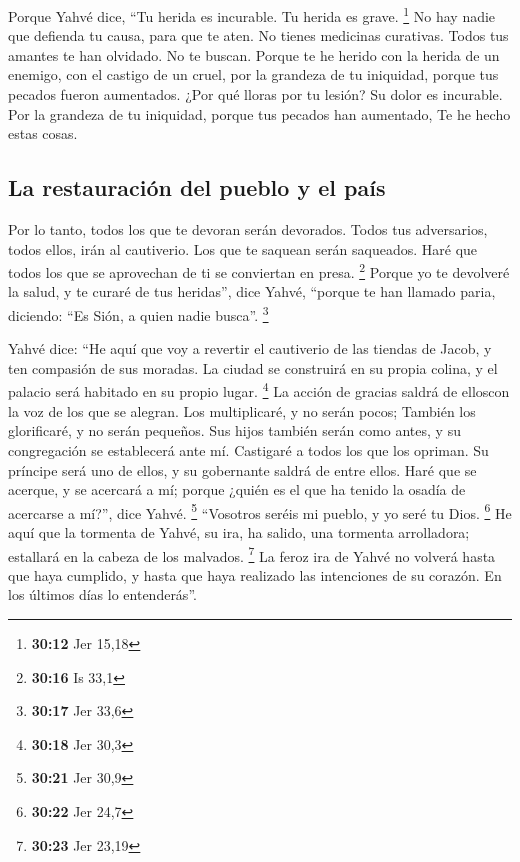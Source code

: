  Porque Yahvé dice, ``Tu herida es incurable. Tu herida
es grave. \footnote{\textbf{30:12} Jer 15,18}  No hay
nadie que defienda tu causa, para que te aten. No tienes medicinas
curativas.  Todos tus amantes te han olvidado. No te
buscan. Porque te he herido con la herida de un enemigo, con el castigo
de un cruel, por la grandeza de tu iniquidad, porque tus pecados fueron
aumentados.  ¿Por qué lloras por tu lesión? Su dolor es
incurable. Por la grandeza de tu iniquidad, porque tus pecados han
aumentado, Te he hecho estas cosas.

\hypertarget{la-restauraciuxf3n-del-pueblo-y-el-pauxeds}{%
\subsection{La restauración del pueblo y el
país}\label{la-restauraciuxf3n-del-pueblo-y-el-pauxeds}}

 Por lo tanto, todos los que te devoran serán devorados.
Todos tus adversarios, todos ellos, irán al cautiverio. Los que te
saquean serán saqueados. Haré que todos los que se aprovechan de ti se
conviertan en presa. \footnote{\textbf{30:16} Is 33,1} 
Porque yo te devolveré la salud, y te curaré de tus heridas'', dice
Yahvé, ``porque te han llamado paria, diciendo: ``Es Sión, a quien nadie
busca''. \footnote{\textbf{30:17} Jer 33,6}

 Yahvé dice: ``He aquí que voy a revertir el cautiverio
de las tiendas de Jacob, y ten compasión de sus moradas. La ciudad se
construirá en su propia colina, y el palacio será habitado en su propio
lugar. \footnote{\textbf{30:18} Jer 30,3}  La acción de
gracias saldrá de elloscon la voz de los que se alegran. Los
multiplicaré, y no serán pocos; También los glorificaré, y no serán
pequeños.  Sus hijos también serán como antes, y su
congregación se establecerá ante mí. Castigaré a todos los que los
opriman.  Su príncipe será uno de ellos, y su gobernante
saldrá de entre ellos. Haré que se acerque, y se acercará a mí; porque
¿quién es el que ha tenido la osadía de acercarse a mí?'', dice Yahvé.
\footnote{\textbf{30:21} Jer 30,9}  ``Vosotros seréis mi
pueblo, y yo seré tu Dios. \footnote{\textbf{30:22} Jer 24,7}
 He aquí que la tormenta de Yahvé, su ira, ha salido, una
tormenta arrolladora; estallará en la cabeza de los malvados.
\footnote{\textbf{30:23} Jer 23,19}  La feroz ira de
Yahvé no volverá hasta que haya cumplido, y hasta que haya realizado las
intenciones de su corazón. En los últimos días lo entenderás''.

